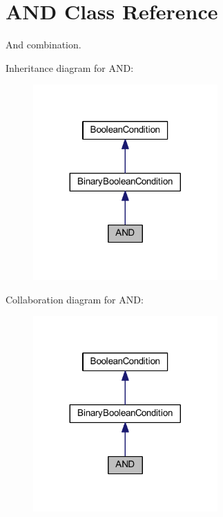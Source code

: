 \hypertarget{class_a_n_d}{\section{A\-N\-D Class Reference}
\label{class_a_n_d}
}


And combination.  




Inheritance diagram for A\-N\-D\-:\nopagebreak
\begin{figure}[H]
\begin{center}
\leavevmode
\includegraphics[width=200pt]{class_a_n_d__inherit__graph}
\end{center}
\end{figure}


Collaboration diagram for A\-N\-D\-:\nopagebreak
\begin{figure}[H]
\begin{center}
\leavevmode
\includegraphics[width=200pt]{class_a_n_d__coll__graph}
\end{center}
\end{figure}
